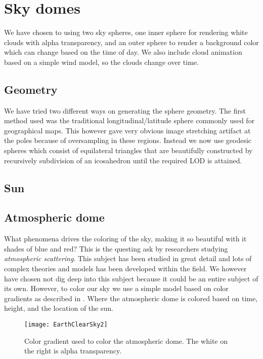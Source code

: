 \section{Sky domes}
We have chosen to using two sky spheres, one inner sphere for
rendering white clouds with alpha transparency, and an outer sphere to
render a background color which can change based on the time of day.
We also include cloud animation based on a simple wind model, so
the clouds change over time.

\subsection{Geometry}
We have tried two different ways on generating the sphere
geometry. The first method used was the traditional longitudinal/latitude
sphere commonly used for geographical maps. This
however gave very obvious image stretching artifact at the poles
because of oversampling in these regions. Instead we now use geodesic
spheres which consist of equilateral triangles that are beautifully
constructed by recursively subdivision of an icosahedron until the
required LOD is attained.

\subsection{Sun}

\subsection{Atmospheric dome}
What phenomena drives the coloring of the sky, making it so beautiful
with it shades of blue and red?
This is the questing ask by researchers studying 
\emph{atmospheric scattering}. This subject has been studied in great detail
and lots of complex theories and models has been developed within the field.
We however have chosen not dig deep into this subject because it could
be an entire subject of its own.
%
However, to color our sky we use a simple model based on color
gradients as described in .
Where the atmospheric dome is colored based on time, height, and the
location of the sun.

\begin{figure}[!h]
  \centering
  \texttt{[image: EarthClearSky2]}
  \caption{Color gradient used to color the atmospheric dome. The
    white on the right is alpha transparency.}
  \label{fig:sky-gradient}
\end{figure}

